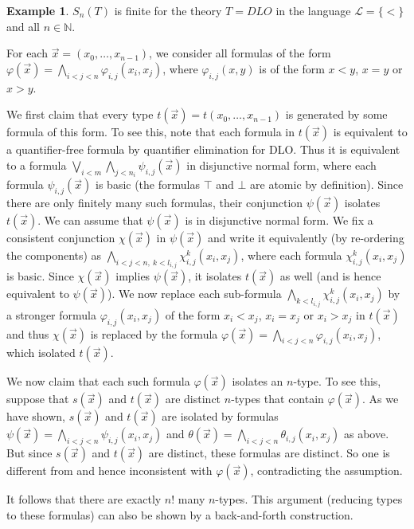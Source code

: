 \documentclass[10pt]{amsart}
\renewcommand{\L}{\mathcal{L}}
\newcommand{\NNN}{\mathbb{N}}
\theoremstyle{definition}
\newtheorem{example}[theorem]{Example}
\theoremstyle{remark}
\begin{document}
\begin{example} 
$S_n(T)$ is finite for the theory $T=DLO$ in the language $\L=\{<\}$ and all $n\in\NNN$. 

For each $\vec{x}=(x_0,\dots,x_{n-1})$, we consider all formulas of the form $\varphi(\vec{x})=\bigwedge_{i<j<n} \varphi_{i,j}(x_i,x_j)$, where $\varphi_{i,j}(x,y)$ is of the form $x<y$, $x=y$ or $x>y$. 

We first claim that every type $t(\vec{x})=t(x_0,\dots,x_{n-1})$ is generated by some formula of this form. To see this, note that each formula in $t(\vec{x})$ is equivalent to a quantifier-free formula by quantifier elimination for DLO. Thus it is equivalent to a formula $\bigvee_{i<m} \bigwedge_{ j<n_i} \psi_{i,j}(\vec{x})$ in disjunctive normal form, where each formula $\psi_{i,j}(\vec{x})$ is basic (the formulas $\top$ and $\bot$ are atomic by definition). Since there are only finitely many such formulas, their conjunction $\psi(\vec{x})$ isolates $t(\vec{x})$. We can assume that $\psi(\vec{x})$ is in disjunctive normal form. We fix a consistent conjunction $\chi(\vec{x})$ in $\psi(\vec{x})$ and write it equivalently (by re-ordering the components) as $\bigwedge_{i<j<n,\ k<l_{i,j}} \chi_{i,j}^k(x_i,x_j)$, where each formula $\chi_{i,j}^k(x_i,x_j)$ is basic. 
Since $\chi(\vec{x})$ implies $\psi(\vec{x})$, it isolates $t(\vec{x})$ as well (and is hence equivalent to $\psi(\vec{x})$). 
We now replace each sub-formula $\bigwedge_{k<l_{i,j}}\chi_{i,j}^k(x_i,x_j)$ by a stronger formula $\varphi_{i,j}(x_i,x_j)$ of the form $x_i<x_j$, $x_i=x_j$ or $x_i>x_j$ in $t(\vec{x})$ and thus $\chi(\vec{x})$ is replaced by the formula $\varphi(\vec{x})=\bigwedge_{i<j<n} \varphi_{i,j}(x_i,x_j)$, which isolated $t(\vec{x})$. 

We now claim that each such formula $\varphi(\vec{x})$ isolates an $n$-type. To see this, suppose that $s(\vec{x})$ and $t(\vec{x})$ are distinct $n$-types that contain $\varphi(\vec{x})$. As we have shown, $s(\vec{x})$ and $t(\vec{x})$ are isolated by formulas $\psi(\vec{x})=\bigwedge_{i<j<n} \psi_{i,j}(x_i,x_j)$ and $\theta(\vec{x})=\bigwedge_{i<j<n} \theta_{i,j}(x_i,x_j)$ as above. But since $s(\vec{x})$ and $t(\vec{x})$ are distinct, these formulas are distinct. So one is different from and hence inconsistent with $\varphi(\vec{x})$, contradicting the assumption. 

It follows that there are exactly $n!$ many $n$-types. This argument (reducing types to these formulas) can also be shown by a back-and-forth construction. 
\end{example} 
\end{document}
